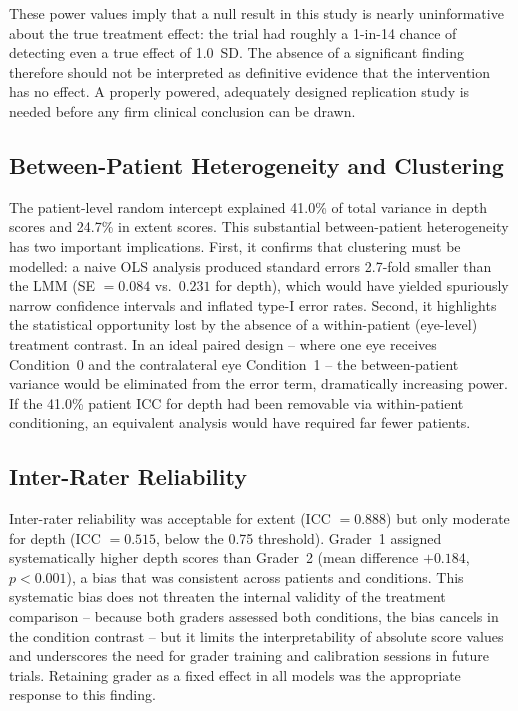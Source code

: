 These power values imply that a null result in this study is nearly uninformative about the true treatment effect: the trial had roughly a 1-in-14 chance of detecting even a true effect of 1.0~SD. The absence of a significant finding therefore should not be interpreted as definitive evidence that the intervention has no effect. A properly powered, adequately designed replication study is needed before any firm clinical conclusion can be drawn.

\subsection{Between-Patient Heterogeneity and Clustering}

The patient-level random intercept explained 41.0\% of total variance in depth scores and 24.7\% in extent scores. This substantial between-patient heterogeneity has two important implications. First, it confirms that clustering must be modelled: a naive OLS analysis produced standard errors 2.7-fold smaller than the LMM (SE $= 0.084$ vs.\ $0.231$ for depth), which would have yielded spuriously narrow confidence intervals and inflated type-I error rates. Second, it highlights the statistical opportunity lost by the absence of a within-patient (eye-level) treatment contrast. In an ideal paired design -- where one eye receives Condition~0 and the contralateral eye Condition~1 -- the between-patient variance would be eliminated from the error term, dramatically increasing power. If the 41.0\% patient ICC for depth had been removable via within-patient conditioning, an equivalent analysis would have required far fewer patients.

\subsection{Inter-Rater Reliability}

Inter-rater reliability was acceptable for extent (ICC $= 0.888$) but only moderate for depth (ICC $= 0.515$, below the 0.75 threshold). Grader~1 assigned systematically higher depth scores than Grader~2 (mean difference $+0.184$, $p < 0.001$), a bias that was consistent across patients and conditions. This systematic bias does not threaten the internal validity of the treatment comparison -- because both graders assessed both conditions, the bias cancels in the condition contrast -- but it limits the interpretability of absolute score values and underscores the need for grader training and calibration sessions in future trials. Retaining grader as a fixed effect in all models was the appropriate response to this finding.

